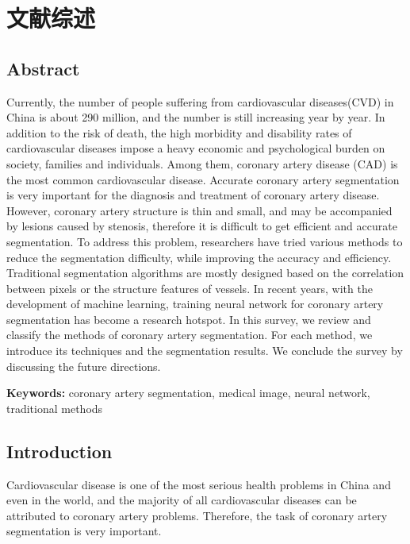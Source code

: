 \documentclass[lang=cn,11pt,a4paper,cite=numbers]{elegantpaper}
\begin{document}
\tableofcontents
\newpage

\section{文献综述}

\subsection{Abstract}

Currently, the number of people suffering from cardiovascular diseases(CVD) in China is about 290 million, and the number is still increasing year by year. In addition to the risk of death, the high morbidity and disability rates of cardiovascular diseases impose a heavy economic and psychological burden on society, families and individuals. Among them, coronary artery disease (CAD) is the most common cardiovascular disease. Accurate coronary artery segmentation is very important for the diagnosis and treatment of coronary artery disease. However, coronary artery structure is thin and small, and may be accompanied by lesions caused by stenosis, therefore it is difficult to get efficient and accurate segmentation. To address this problem, researchers have tried various methods to reduce the segmentation difficulty, while improving the accuracy and efficiency. Traditional segmentation algorithms are mostly designed based on the correlation between pixels or the structure features of vessels. In recent years, with the development of machine learning, training neural network for coronary artery segmentation has become a research hotspot. In this survey, we review and classify the methods of coronary artery segmentation. For each method, we introduce its techniques and the segmentation results. We conclude the survey by discussing the future directions.

\textbf{Keywords:} coronary artery segmentation, medical image, neural network, traditional methods

\subsection{Introduction}

Cardiovascular disease is one of the most serious health problems in China and even in the world, and the majority of all cardiovascular diseases can be attributed to coronary artery problems. Therefore, the task of coronary artery segmentation is very important.
\end{document}
